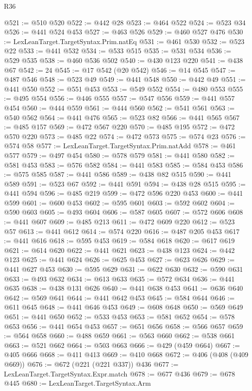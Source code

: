 \begin{lexlean}{R36}
\begin{coremodule}
@521 := @510 @520
@522 := @442 @28
@523 := @464 @522
@524 := @523 @34
@526 := @441 @524 @453
@527 := @463 @526
@529 := @460 @527 @476
@530 := LexLeanTarget.TargetSyntax.Prim.natEq
@531 := @461 @530
@532 := @523 @22
@533 := @441 @532
@534 := @533 @515
@535 := @531 @534
@536 := @529 @535
@538 := @460 @536 @502
@540 := @430 @123 @220
@541 := @438 @67
@542 := 24
@545 := @17 @542 (@20 @542)
@546 := @14 @545
@547 := @487 @546
@548 := @523 @49
@549 := @441 @548
@550 := @442 @49
@551 := @441 @550
@552 := @551 @453
@553 := @549 @552
@554 := @480 @553
@555 := @495 @554
@556 := @446 @555
@557 := @547 @556
@559 := @441 @557 @454
@560 := @444 @559
@561 := @444 @560
@562 := @541 @561
@563 := @540 @562
@564 := @441 @476
@565 := @523 @82
@566 := @441 @565
@567 := @485 @157
@569 := @472 @567 @220
@570 := @485 @195
@572 := @472 @570 @220
@573 := @485 @22
@574 := @472 @573
@575 := @574 @23
@576 := @574 @58
@577 := LexLeanTarget.TargetSyntax.Prim.natAdd
@578 := @461 @577
@579 := @497 @454
@580 := @578 @579
@581 := @441 @580
@582 := @581 @453
@583 := @576 @582
@584 := @441 @583
@585 := @584 @453
@586 := @575 @585
@587 := @441 @586
@589 := @438 @82 @515
@590 := @441 @589
@591 := @523 @67
@592 := @441 @591
@594 := @438 @28 @515
@595 := @441 @594
@596 := @485 @219
@599 := @472 @596 @220 @453
@600 := @441 @599
@601 := @600 @453
@602 := @595 @601
@603 := @592 @602
@604 := @590 @603
@605 := @493 @604
@606 := @587 @605
@607 := @572 @606
@608 := @441 @607
@609 := @485 @213
@611 := @472 @609 @220
@612 := @523 @57
@613 := @441 @612
@614 := @574 @220
@616 := @487 @205 @453
@617 := @441 @616
@618 := @595 @453
@619 := @584 @618
@620 := @617 @619
@621 := @614 @620
@622 := @441 @621
@623 := @438 @123
@624 := @442 @123
@625 := @441 @624
@626 := @625 @453
@627 := @623 @626
@629 := @441 @627 @453
@630 := @595 @629
@631 := @622 @630
@632 := @590 @631
@633 := @493 @632
@634 := @613 @633
@635 := @572 @634
@636 := @441 @635
@638 := @438 @131 @626
@640 := @441 @638 @453
@641 := @636 @640
@642 := @569 @641
@644 := @441 @642 @453
@645 := @584 @644
@646 := @611 @645
@648 := @441 @646 @453
@649 := @608 @648
@650 := @569 @649
@651 := @441 @650
@652 := @533 @453
@653 := @581 @652
@654 := @578 @653
@656 := @441 @654 @453
@657 := @651 @656
@658 := @566 @657
@659 := @564 @658
@660 := @488 @659
@661 := @563 @660
@662 := @538 @661
@663 := @521 @662
@664 := @503 @663
@666 := @429 (@459 @664)
@667 := @405 @666
@668 := @411 @413
@669 := @410 @668
@672 := @406 (@408 (@409 @669))
@676 := @672 (@221 (@221 @337)) @436
@677 := LexLeanTarget.TargetSyntax.Expr.match
@678 := @677 @436
@679 := @678 @445
@680 := LexLeanTarget.TargetSyntax.Arm

\end{coremodule}
\end{lexlean}
